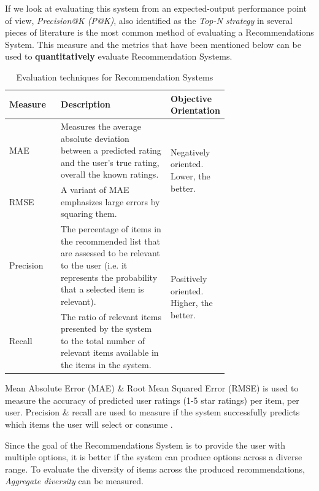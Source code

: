 \documentclass[manuscript,screen,natbib=false]{acmart}
\begin{document}
If we look at evaluating this system from an expected-output performance point of view, \textit{Precision@K (P@K)}, also identified as the \textit{Top-N strategy} in several pieces of literature is the most common method of evaluating a Recommendations System.
This measure and the metrics that have been mentioned below can be used to \textbf{quantitatively} evaluate Recommendation Systems.

\begin{table}[h]
\caption{Evaluation techniques for Recommendation Systems}
\label{tab:evaluation-techniques-table}
\centering
\begin{tabular}{|l|p{0.5\linewidth}|p{0.21\linewidth}|} 
\hline
Measure & Description & Objective Orientation \\ 
\hline
MAE & Measures the average absolute deviation between a predicted rating and the user’s true rating, overall the known ratings. & \multirow{2}{=}{Negatively oriented. Lower, the better.} \\ 
\cline{1-2}
RMSE & A variant of MAE emphasizes large errors by squaring them. &  \\ 
\hline
Precision & The percentage of items in the recommended list that are assessed to be relevant to the user (i.e. it represents the probability that a selected item is relevant). & \multirow{2}{=}{Positively oriented. Higher, the better.} \\ 
\cline{1-2}
Recall & The ratio of relevant items presented by the system to the total number of relevant items available in the items in the system. &  \\
\hline
\end{tabular}
\end{table}

Mean Absolute Error (MAE) \& Root Mean Squared Error (RMSE) is used to measure the accuracy of predicted user ratings (1-5 star ratings) per item, per user. Precision \& recall are used to measure if the system successfully predicts which items the user will select or consume \cite{dayan_recommenders_2011}.


Since the goal of the Recommendations System is to provide the user with multiple options, it is better if the system can produce options across a diverse range. To evaluate the diversity of items across the produced recommendations, \textit{Aggregate diversity} can be measured.
\end{document}

